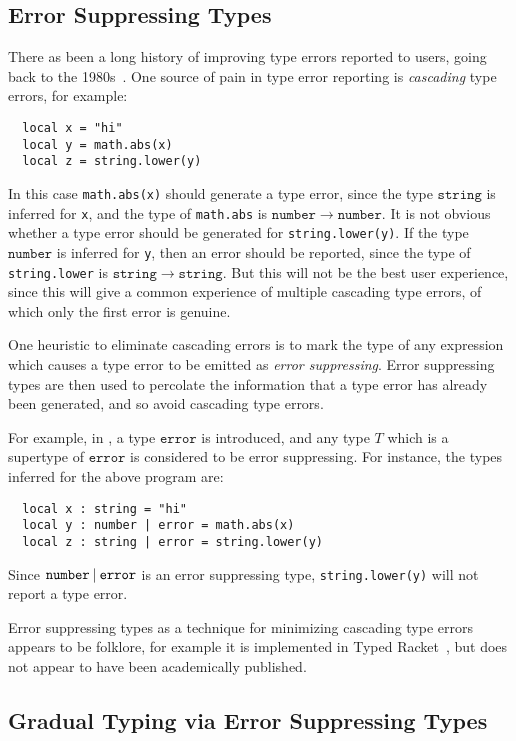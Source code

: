 \documentclass[acmsmall,review,screen]{acmart}
\newcommand{\ERROR}{\mathtt{error}}
\newcommand{\NUMBER}{\mathtt{number}}
\newcommand{\STRING}{\mathtt{string}}
\newcommand{\UNION}{\mathbin{\mathtt{\char`\|}}}
\newcommand{\fun}{\mathbin{\rightarrow}}
\begin{document}
\subsection{Error Suppressing Types}

There as been a long history of improving type errors reported to
users, going back to the
1980s~\cite{Wan86:FindingSource,JW86:MaximumFlow}.
One source of pain in type error reporting is \emph{cascading}
type errors, for example:
\begin{verbatim}
  local x = "hi"
  local y = math.abs(x)
  local z = string.lower(y)
\end{verbatim}
In this case \verb|math.abs(x)| should generate a type error, since
the type $\STRING$ is inferred for \verb|x|, and the type of
\verb|math.abs| is $\NUMBER \fun \NUMBER$.  It is not obvious whether
a type error should be generated for \verb|string.lower(y)|. If the
type $\NUMBER$ is inferred for \verb|y|, then an error should be
reported, since the type of \verb|string.lower| is $\STRING \fun \STRING$.
But this will not be the best user experience, since this will
give a common experience of multiple cascading type errors, of which only
the first error is genuine.

One heuristic to eliminate cascading errors is to mark the type of any
expression which causes a type error to be emitted as \emph{error
suppressing}. Error suppressing types are then used to percolate the
information that a type error has already been generated, and so avoid
cascading type errors.

For example, in , a type $\ERROR$ is introduced, and any
type $T$ which is a supertype of $\ERROR$ is considered to be error
suppressing. For instance, the types inferred for the above program
are:
\begin{verbatim}
  local x : string = "hi"
  local y : number | error = math.abs(x)
  local z : string | error = string.lower(y)
\end{verbatim}
Since $\NUMBER \UNION \ERROR$ is an error suppressing type,
\verb|string.lower(y)| will not report a type error.

Error suppressing types as a technique for minimizing cascading type
errors appears to be folklore, for example it is implemented in Typed
Racket~\cite{TH08:ErrorHandling}, but does not appear to have been
academically published.

\subsection{Gradual Typing via Error Suppressing Types}
\end{document}
